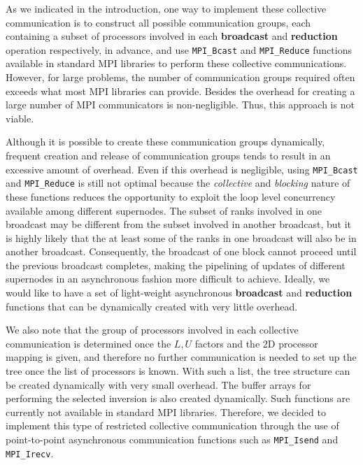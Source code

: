 \documentclass{acm_proc_article-sp}
\begin{document}
As we indicated in the introduction, one way to implement
these collective communication is to construct all possible 
communication groups, each containing a subset of processors
involved in each \textbf{broadcast} and \textbf{reduction}
operation respectively, in advance, and use \texttt{MPI\_Bcast} 
and \texttt{MPI\_Reduce} functions available in standard MPI 
libraries to perform these collective communications. However, 
for large problems, the number of communication groups required 
often exceeds what most MPI libraries can provide. Besides the overhead
for creating a large number of MPI communicators is non-negligible.
Thus, this approach is not viable.

Although it is possible to create these communication groups
dynamically, frequent creation and release of communication
groups tends to result in an excessive amount of overhead. 
Even if this overhead is negligible, using \texttt{MPI\_Bcast}
and \texttt{MPI\_Reduce} is still not optimal because the
{\em collective} and {\em blocking} nature of these functions
reduces the opportunity to exploit the loop level concurrency
available among different supernodes. The subset of ranks involved
in one broadcast may be different from the subset involved in another
broadcast, but it is highly likely that the at least some of the ranks
in one broadcast will also be in another broadcast. Consequently,
the broadcast of one block cannot proceed until the previous
broadcast completes, making the pipelining of updates of different
supernodes in an asynchronous fashion more difficult to achieve. 
Ideally, we would like to have a set of light-weight asynchronous 
\textbf{broadcast} and \textbf{reduction} functions that can
be dynamically created with very little overhead.

We also note that the group of processors involved in each collective
communication is determined once the $L,U$ factors and the 2D processor
mapping is given, and therefore no further communication is needed to
set up the tree once the list of processors is known. With such a list,
the tree structure can be created dynamically with very small overhead.
The buffer arrays for performing the selected inversion is also created
dynamically. Such functions are currently not available in standard MPI 
libraries. Therefore, we decided to implement this type of 
restricted collective communication through the use of
point-to-point asynchronous communication functions such
as \texttt{MPI\_Isend} and \texttt{MPI\_Irecv}. 
\end{document}
